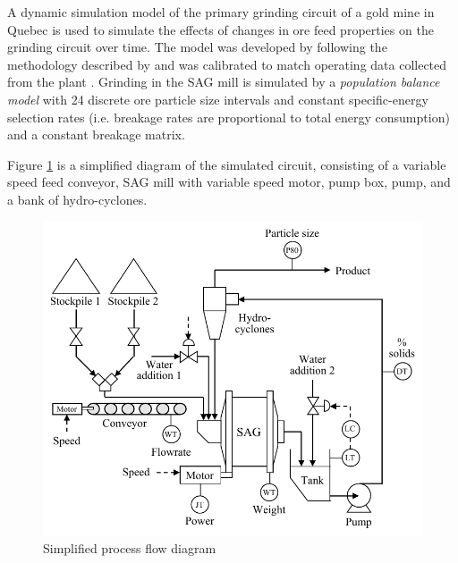 {%

A dynamic simulation model of the primary grinding circuit of a gold mine in Quebec is used to simulate the effects of changes in ore feed properties on the grinding circuit over time. The model was developed by \cite{perez_garcia_dynamic_2020} following the methodology described by \cite{grimble_dynamic_2010} and was calibrated to match operating data collected from the plant \citep{perez-garcia_systematic_2020}. Grinding in the SAG mill is simulated by a \textit{population balance model} with 24 discrete ore particle size intervals and constant specific-energy selection rates (i.e. breakage rates are proportional to total energy consumption) and a constant breakage matrix.

Figure \ref{fig:sag-diag} is a simplified diagram of the simulated circuit, consisting of a variable speed feed conveyor, SAG mill with variable speed motor, pump box, pump, and a bank of hydro-cyclones.\begin{figure}[htp]
	\centering
	\includegraphics[width=12.5cm]{images/sag-circuit-diag.pdf}
	\caption{Simplified process flow diagram}
	\label{fig:sag-diag}
\end{figure}

}
